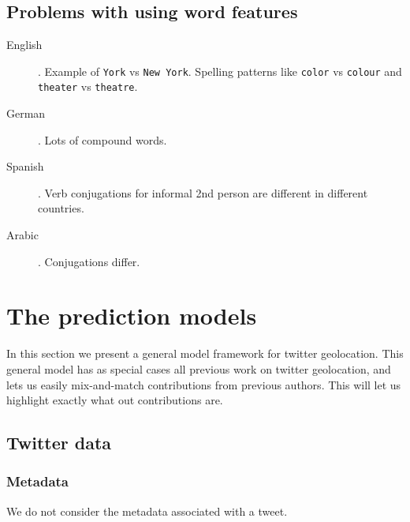 \documentclass{article}
\newcommand{\str}[1]{\texttt{#1}}
\begin{document}
\subsection{Problems with using word features}

\begin{description}
    \item[English]. 
        Example of \str{York} vs \str{New York}.  
        Spelling patterns like \str{color} vs \str{colour} and \str{theater} vs \str{theatre}.
    \item[German]. Lots of compound words.
    \item[Spanish]. Verb conjugations for informal 2nd person are different in different countries.
    \item[Arabic]. Conjugations differ.
\end{description}

\section{The prediction models}
In this section we present a general model framework for twitter geolocation.
This general model has as special cases all previous work on twitter geolocation,
and lets us easily mix-and-match contributions from previous authors.
This will let us highlight exactly what out contributions are.

\subsection{Twitter data}

\subsubsection{Metadata}

We do not consider the metadata associated with a tweet. 
\end{document}
